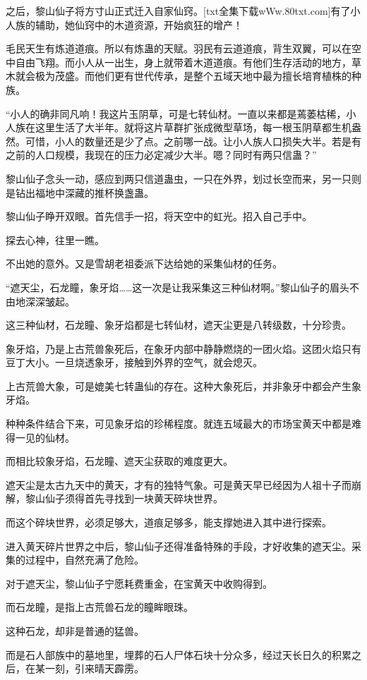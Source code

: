 \begin{this_body}
之后，黎山仙子将方寸山正式迁入自家仙窍。[txt全集下载wWw.80txt.com]有了小人族的辅助，她仙窍中的木道资源，开始疯狂的增产！

毛民天生有炼道道痕。所以有炼蛊的天赋。羽民有云道道痕，背生双翼，可以在空中自由飞翔。而小人从一出生，身上就带着木道道痕。有他们生存活动的地方，草木就会极为茂盛。而他们更有世代传承，是整个五域天地中最为擅长培育植株的种族。

“小人的确非同凡响！我这片玉阴草，可是七转仙材。一直以来都是蔫萎枯稀，小人族在这里生活了大半年。就将这片草群扩张成微型草场，每一根玉阴草都生机盎然。可惜，小人的数量还是少了点。之前哪一战。让小人族人口损失大半。若是有之前的人口规模，我现在的压力必定减少大半。嗯？同时有两只信蛊？”

黎山仙子念头一动，感应到两只信道蛊虫，一只在外界，划过长空而来，另一只则是钻出福地中深藏的推杯换盏蛊。

黎山仙子睁开双眼。首先信手一招，将天空中的虹光。招入自己手中。

探去心神，往里一瞧。

不出她的意外。又是雪胡老祖委派下达给她的采集仙材的任务。

“遮天尘，石龙瞳，象牙焰……这一次是让我采集这三种仙材啊。”黎山仙子的眉头不由地深深皱起。

这三种仙材，石龙瞳、象牙焰都是七转仙材，遮天尘更是八转级数，十分珍贵。

象牙焰，乃是上古荒兽象死后，在象牙内部中静静燃烧的一团火焰。这团火焰只有豆丁大小。一旦烧透象牙，接触到外界的空气，就会熄灭。

上古荒兽大象，可是媲美七转蛊仙的存在。这种大象死后，并非象牙中都会产生象牙焰。

种种条件结合下来，可见象牙焰的珍稀程度。就连五域最大的市场宝黄天中都是难得一见的仙材。

而相比较象牙焰，石龙瞳、遮天尘获取的难度更大。

遮天尘是太古九天中的黄天，才有的独特气象。可是黄天早已经因为人祖十子而崩解，黎山仙子须得首先寻找到一块黄天碎块世界。

而这个碎块世界，必须足够大，道痕足够多，能支撑她进入其中进行探索。

进入黄天碎片世界之中后，黎山仙子还得准备特殊的手段，才好收集的遮天尘。采集的过程中，自然充满了危险。

对于遮天尘，黎山仙子宁愿耗费重金，在宝黄天中收购得到。

而石龙瞳，是指上古荒兽石龙的瞳眸眼珠。

这种石龙，却非是普通的猛兽。

而是石人部族中的墓地里，埋葬的石人尸体石块十分众多，经过天长日久的积累之后，在某一刻，引来晴天霹雳。


\end{this_body}
